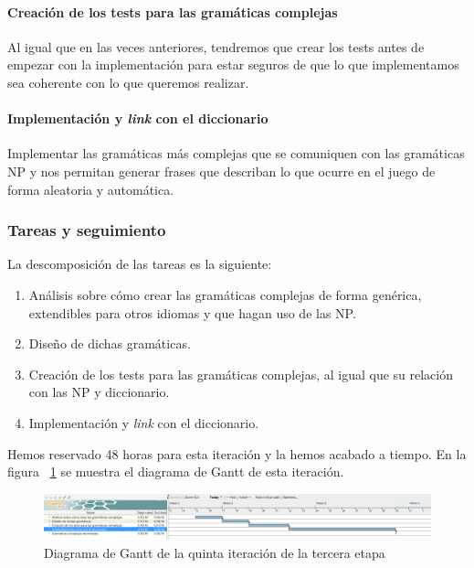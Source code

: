 \paragraph{Creación de los tests para las gramáticas complejas} Al igual que en las veces anteriores, tendremos que crear los tests antes de empezar con la implementación para estar seguros de que lo que implementamos sea coherente con lo que queremos realizar.

\paragraph{Implementación y \textit{link} con el diccionario} Implementar las gramáticas más complejas que se comuniquen con las gramáticas NP y nos permitan generar frases que describan lo que ocurre en el juego de forma aleatoria y automática.

\subsubsection{Tareas y seguimiento}

La descomposición de las tareas es la siguiente:

\begin{enumerate}[label=\bfseries WBS 5.\arabic*]
  \item Análisis sobre cómo crear las gramáticas complejas de forma genérica, extendibles para otros idiomas y que hagan uso de las NP.
  \item Diseño de dichas gramáticas.
  \item Creación de los tests para las gramáticas complejas, al igual que su relación con las NP y diccionario.
  \item Implementación y \textit{link} con el diccionario.
\end{enumerate}

Hemos reservado 48 horas para esta iteración y la hemos acabado a tiempo. En la figura ~\ref{fig:sec3it5} se muestra el diagrama de Gantt de esta iteración.

\begin{figure}
    \includegraphics[width=\textwidth,height=\textheight,keepaspectratio]{./img/sec3it5.png}
  \caption{Diagrama de Gantt de la quinta iteración de la tercera etapa}
  \label{fig:sec3it5}
\end{figure}

